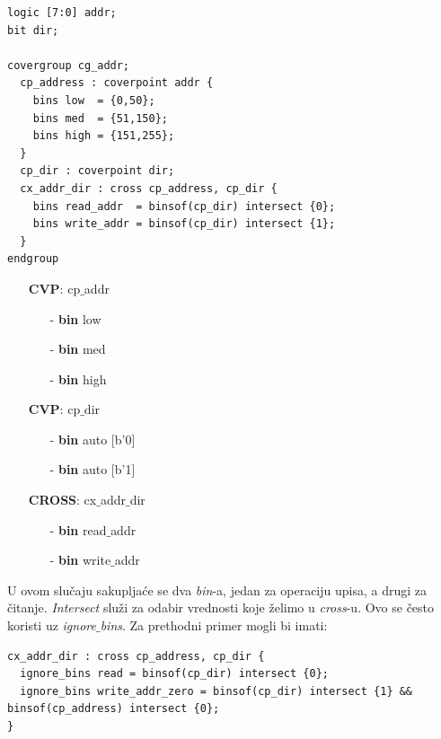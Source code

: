 \begin{lstlisting}
logic [7:0] addr;
bit dir;

covergroup cg_addr;
  cp_address : coverpoint addr {
    bins low  = {0,50};
    bins med  = {51,150};
    bins high = {151,255};
  }
  cp_dir : coverpoint dir;
  cx_addr_dir : cross cp_address, cp_dir {
    bins read_addr  = binsof(cp_dir) intersect {0};
    bins write_addr = binsof(cp_dir) intersect {1};
  }
endgroup
\end{lstlisting}

\begin{itemize}
\item[] \textbf{CVP}: cp\(\_\)addr
  \begin{itemize}
  \item[-] \textbf{bin} low
  \item[-] \textbf{bin} med
  \item[-] \textbf{bin} high
  \end{itemize}
\item[] \textbf{CVP}: cp\(\_\)dir
  \begin{itemize}
  \item[-] \textbf{bin} auto [b'0]
  \item[-] \textbf{bin} auto [b'1]
  \end{itemize}
\item[] \textbf{CROSS}: cx\(\_\)addr\(\_\)dir
  \begin{itemize}
  \item[-] \textbf{bin} read\(\_\)addr
  \item[-] \textbf{bin} write\(\_\)addr
  \end{itemize}
\end{itemize}

U ovom slučaju sakupljaće se dva \emph{bin}-a, jedan za operaciju upisa, a drugi
za čitanje. \emph{Intersect} služi za odabir vrednosti koje želimo u
\emph{cross}-u. Ovo se često koristi uz \emph{ignore\(\_\)bins}. Za prethodni
primer mogli bi imati:

\begin{lstlisting}
cx_addr_dir : cross cp_address, cp_dir {
  ignore_bins read = binsof(cp_dir) intersect {0};
  ignore_bins write_addr_zero = binsof(cp_dir) intersect {1} && binsof(cp_address) intersect {0};
}
\end{lstlisting}

